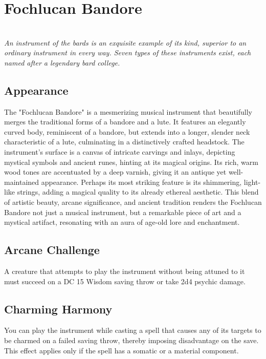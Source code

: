 \documentclass[letterpaper,openany,oneside,twocolumn]{book}
\begin{document}
\chapter*{Fochlucan Bandore}
\\

\textit{An instrument of the bards is an exquisite example of its kind, superior to an ordinary instrument in every way. Seven types of these instruments exist, each named after a legendary bard college.}

\section*{Appearance}
The "Fochlucan Bandore" is a mesmerizing musical instrument that beautifully merges the traditional forms of a bandore and a lute. It features an elegantly curved body, reminiscent of a bandore, but extends into a longer, slender neck characteristic of a lute, culminating in a distinctively crafted headstock. The instrument's surface is a canvas of intricate carvings and inlays, depicting mystical symbols and ancient runes, hinting at its magical origins. Its rich, warm wood tones are accentuated by a deep varnish, giving it an antique yet well-maintained appearance. Perhaps its most striking feature is its shimmering, light-like strings, adding a magical quality to its already ethereal aesthetic. This blend of artistic beauty, arcane significance, and ancient tradition renders the Fochlucan Bandore not just a musical instrument, but a remarkable piece of art and a mystical artifact, resonating with an aura of age-old lore and enchantment.

\section*{Arcane Challenge}
A creature that attempts to play the instrument without being attuned to it must succeed on a DC 15 Wisdom saving throw or take 2d4 psychic damage.

\section*{Charming Harmony}
You can play the instrument while casting a spell that causes any of its targets to be charmed on a failed saving throw, thereby imposing disadvantage on the save. This effect applies only if the spell has a somatic or a material component.
\end{document}
